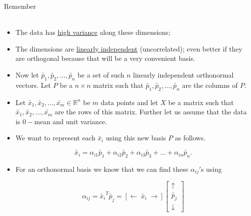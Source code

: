 \documentclass[10pt, aspectratio=169]{beamer}
\begin{document}
\begin{frame}
\begin{block}{ Remember}
 \\
 \\ 

\begin{itemize}

\item<4-> The data has \underline{high variance} along these dimensions;

\item<5-> The dimensions are \underline{linearly independent} (uncorrelated); even better if they are orthogonal because that will be a very convenient basis. \\

\end{itemize}

\end{block}
\end{frame}

\begin{frame}
\begin{itemize}
\item<1-> Now let $\utilde{p_1}, \utilde{p_2}, \ldots , \utilde{p_n}$ be a set of such $n$ linearly independent orthonormal vectors. Let $P$ be a $n \times n$ matrix such that $\utilde{p_1}, \utilde{p_2}, \ldots , \utilde{p_n}$ are the columns of $P$. \\

\item<2-> Let $\utilde{x_1}, \utilde{x_2}, \ldots , \utilde{x_m} \in \mathbb{R}^n$ be $m$ data points and let $X$ be a matrix such that $\utilde{x_1}, \utilde{x_2}, \ldots , \utilde{x_m}$ are the rows of this matrix. Further let us assume that the data is $0-$mean and unit variance. \\

\item<3-> We want to represent each $\utilde{x_i}$ using this new basis $P$ as follows.

$$\utilde{x_i} = \alpha_{i1} \utilde{p_1} + \alpha_{i2} \utilde{p_2} + \alpha_{i3} \utilde{p_3} + \ldots + \alpha_{in} \utilde{p_n}.$$

\item<4-> For an orthonormal basis we know that we can find these $\alpha_{ij}'$s using

\[
\alpha_{ij} = \utilde{x_i}^T \utilde{p_j} = 
\left[
\leftarrow \; \utilde{x_i} \; \rightarrow
\right]
\begin{bmatrix}
\uparrow \\
\utilde{p_j} \\
\downarrow
\end{bmatrix}
\]
\end{itemize}
\end{frame}
\end{document}

